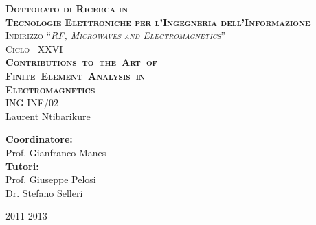 \documentclass[11pt, a4paper]{book}%
\newcommand{\quotes}[1]{``{#1}''}
\numberwithin{equation}{section}
\begin{document}
\begin{center} 
\vspace{1cm}
\Large{\textbf{\textsc{Dottorato di Ricerca}}}
\large{\textbf{\textsc{in}}\\[5pt]
\textbf{\textsc{Tecnologie Elettroniche per l'Ingegneria dell'Informazione\\[5pt]}}
}
\large{
\textsc{Indirizzo \quotes{\textit{RF, Microwaves and Electromagnetics}}}
\\[7pt]
\textsc{Ciclo} \ XXVI\\[45pt]
}
\textsc{\huge \textbf{Contributions~to~the~Art~of~\\\vspace{-5pt}Finite~Element~Analysis~in~\\\vspace{10pt} Electromagnetics}}\\[12pt]
\large{ING-INF/02}\\[20pt]
\Large{Laurent Ntibarikure}\\[25pt]
\end{center}
\vspace{30pt}
\noindent \textbf{Coordinatore:}\\[15pt]
\hspace*{20pt}	Prof. Gianfranco Manes\\[25pt]
\noindent \textbf{Tutori:}\\[15pt]
\hspace*{20pt}	Prof. Giuseppe Pelosi\\[15pt]
\hspace*{20pt}	Dr. Stefano Selleri\\[20pt]
\begin{center}
\large{2011-2013}
\end{center}

\newpage
\thispagestyle{empty}
\cleardoublepage
\thispagestyle{empty}
\par{}

\thispagestyle{empty}

\thispagestyle{empty}
\cleardoublepage

\thispagestyle{empty}
\cleardoublepage
\setcounter{secnumdepth}{5}
\setcounter{tocdepth}{5}
\tableofcontents
\newpage
\thispagestyle{empty}
\listoffigures
\newpage
\thispagestyle{empty}
\listoftables
\listofalgorithms

\thispagestyle{empty}
\cleardoublepage
\end{document}
